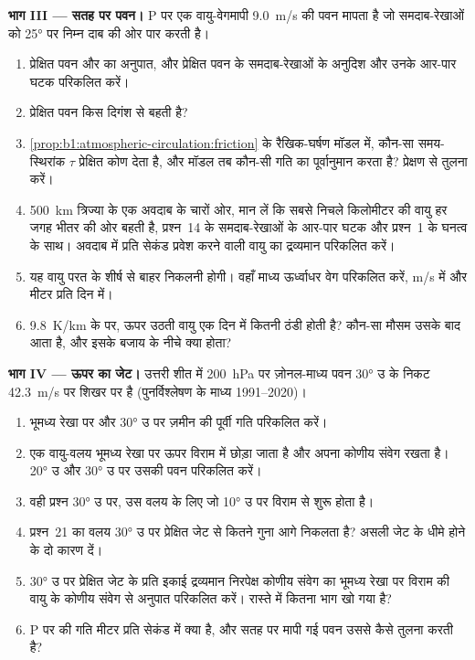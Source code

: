 \begin{problem}
\medskip
\noindent\textbf{भाग III --- सतह पर पवन।} P पर एक वायु-वेगमापी \qty{9.0}{m/s} की पवन मापता है जो समदाब-रेखाओं को \ang{25} पर निम्न दाब की ओर पार करती है।
\begin{enumerate}[resume]
  \item प्रेक्षित पवन और  का अनुपात, और प्रेक्षित पवन के समदाब-रेखाओं के अनुदिश और उनके आर-पार घटक परिकलित करें।
  \item प्रेक्षित पवन किस दिगंश से बहती है?
  \item \cref{prop:b1:atmospheric-circulation:friction} के रैखिक-घर्षण मॉडल में, कौन-सा समय-स्थिरांक $\tau$ प्रेक्षित कोण देता है, और मॉडल तब कौन-सी गति का पूर्वानुमान करता है? प्रेक्षण से तुलना करें।
  \item \qty{500}{km} त्रिज्या के एक अवदाब के चारों ओर, मान लें कि सबसे निचले किलोमीटर की वायु हर जगह भीतर की ओर बहती है, प्रश्न~14 के समदाब-रेखाओं के आर-पार घटक और प्रश्न~1 के घनत्व के साथ। अवदाब में प्रति सेकंड प्रवेश करने वाली वायु का द्रव्यमान परिकलित करें।
  \item यह वायु परत के शीर्ष से बाहर निकलनी होगी। वहाँ माध्य ऊर्ध्वाधर वेग परिकलित करें, \unit{m/s} में और मीटर प्रति दिन में।
  \item \qty{9.8}{K/km} के  पर, ऊपर उठती वायु एक दिन में कितनी ठंडी होती है? कौन-सा मौसम उसके बाद आता है, और इसके बजाय  के नीचे क्या होता?
\end{enumerate}

\medskip
\noindent\textbf{भाग IV --- ऊपर का जेट।} उत्तरी शीत में \qty{200}{hPa} पर ज़ोनल-माध्य पवन \ang{30} उ के निकट \qty{42.3}{m/s} पर शिखर पर है (पुनर्विश्लेषण के माध्य 1991--2020)।
\begin{enumerate}[resume]
  \item भूमध्य रेखा पर और \ang{30} उ पर ज़मीन की पूर्वी गति परिकलित करें।
  \item एक वायु-वलय भूमध्य रेखा पर ऊपर विराम में छोड़ा जाता है और अपना कोणीय संवेग रखता है। \ang{20} उ और \ang{30} उ पर उसकी पवन परिकलित करें।
  \item वही प्रश्न \ang{30} उ पर, उस वलय के लिए जो \ang{10} उ पर विराम से शुरू होता है।
  \item प्रश्न~21 का वलय \ang{30} उ पर प्रेक्षित जेट से कितने गुना आगे निकलता है? असली जेट के धीमे होने के दो कारण दें।
  \item \ang{30} उ पर प्रेक्षित जेट के प्रति इकाई द्रव्यमान निरपेक्ष कोणीय संवेग का भूमध्य रेखा पर विराम की वायु के कोणीय संवेग से अनुपात परिकलित करें। रास्ते में कितना भाग खो गया है?
  \item P पर  की गति मीटर प्रति सेकंड में क्या है, और सतह पर मापी गई पवन उससे कैसे तुलना करती है?
\end{enumerate}
\end{problem}
